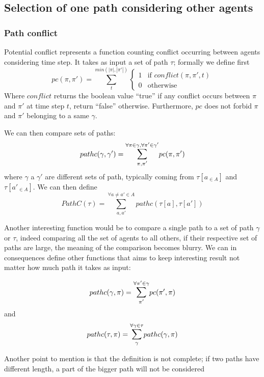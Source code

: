 \subsection{Selection of one path considering other agents}

\subsubsection{Path conflict}
Potential conflict represents a function counting conflict occurring between agents considering time step. It takes as input a set of path \(\tau\); formally we define first \[
    pc(\pi,\pi') =   \sum_{t}^{min(|\pi|,|\pi'|)}{
        \begin{cases}
            1   & \text{if  } conflict(\pi,\pi',t) \\
            0   & \text{otherwise}
        \end{cases}
    }
\] Where \(conflict\) returns the boolean value ``true'' if any conflict occurs between \(\pi\) and \(\pi'\) at time step \(t\), return ``false'' otherwise. Furthermore, \(pc\) does not forbid \(\pi\) and \(\pi'\) belonging to a same \(\gamma\).

We can then compare sets of paths:
\[ 
  pathc(\gamma,\gamma') = \mathlarger{\sum}_{\pi,\pi'}^{\forall \pi \in \gamma,\forall \pi' \in \gamma'}{
        pc(\pi,\pi')
    }
\] where \(\gamma\) a \(\gamma'\) are different sets of path, typically coming from \(\tau[a_{\in A}]\) and \(\tau[a'_{\in A}]\). We can then define \[
    PathC(\tau)= \sum_{a,a'}^{\forall a \neq a' \in A}{
        pathc(\tau[a],\tau[a'])
    }
\]

Another interesting function would be to compare a single path to a set of path \(\gamma\) or \(\tau\), indeed comparing all the set of agents to all others, if their respective set of paths are large, the meaning of the comparison becomes blurry. We can in consequences define other functions that aims to keep interesting result not matter how much path it takes as input:

\[ 
  pathc(\gamma,\pi) = \mathlarger{\sum}_{\pi'}^{\forall \pi' \in \gamma}{
        pc(\pi',\pi)
    }
\] and \[ 
    pathc(\tau,\pi) = \mathlarger{\sum}_{\gamma}^{\forall \gamma \in \tau}{
        pathc(\gamma,\pi)
    }
\]

Another point to mention is that the definition is not complete; if two paths have different length, a part of the bigger path will not be considered

